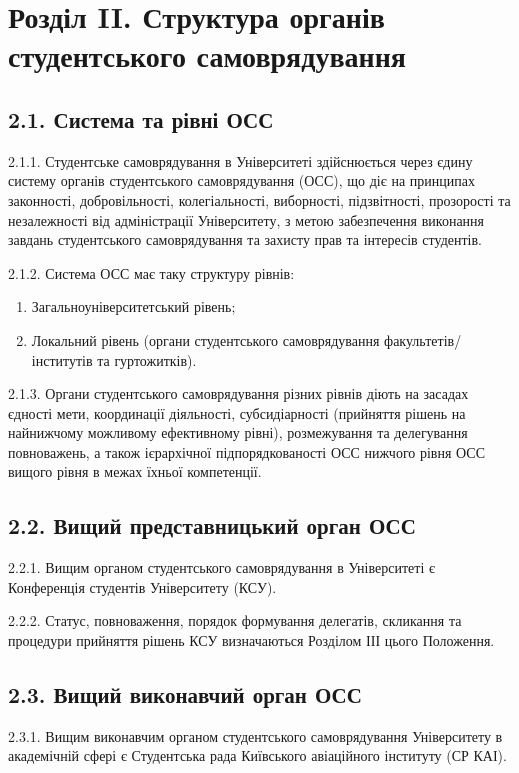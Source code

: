 \section*{Розділ II. Структура органів студентського самоврядування}

\subsection*{2.1. Система та рівні ОСС}
    2.1.1. Студентське самоврядування в Університеті здійснюється через єдину систему органів студентського самоврядування (ОСС), що діє на принципах законності, добровільності, колегіальності, виборності, підзвітності, прозорості та незалежності від адміністрації Університету, з метою забезпечення виконання завдань студентського самоврядування та захисту прав та інтересів студентів.

    2.1.2. Система ОСС має таку структуру рівнів:
    
        \begin{enumerate}[label=\alph*)]
            \item Загальноуніверситетський рівень;
            \item Локальний рівень (органи студентського самоврядування факультетів/інститутів та гуртожитків).
        \end{enumerate}

    2.1.3. Органи студентського самоврядування різних рівнів діють на засадах єдності мети, координації діяльності, субсидіарності (прийняття рішень на найнижчому можливому ефективному рівні), розмежування та делегування повноважень, а також ієрархічної підпорядкованості ОСС нижчого рівня ОСС вищого рівня в межах їхньої компетенції.

\subsection*{2.2. Вищий представницький орган ОСС}
    2.2.1. Вищим органом студентського самоврядування в Університеті є Конференція студентів Університету (КСУ).

    2.2.2. Статус, повноваження, порядок формування делегатів, скликання та процедури прийняття рішень КСУ визначаються Розділом ІІІ цього Положення.

\subsection*{2.3. Вищий виконавчий орган ОСС}
    2.3.1. Вищим виконавчим органом студентського самоврядування Університету в академічній сфері є Студентська рада Київського авіаційного інституту (СР КАІ).

